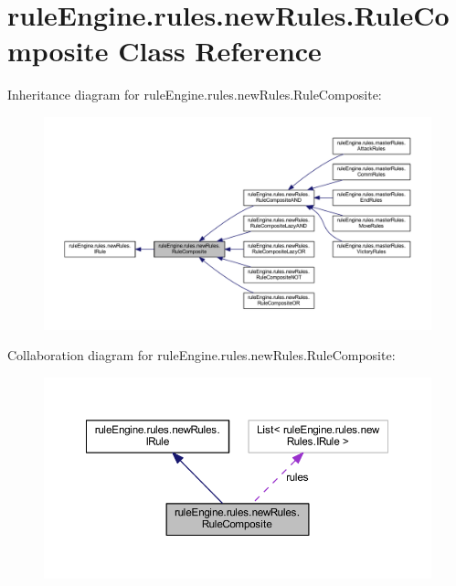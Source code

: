 \hypertarget{classrule_engine_1_1rules_1_1new_rules_1_1_rule_composite}{}\section{rule\+Engine.\+rules.\+new\+Rules.\+Rule\+Composite Class Reference}
\label{classrule_engine_1_1rules_1_1new_rules_1_1_rule_composite}


Inheritance diagram for rule\+Engine.\+rules.\+new\+Rules.\+Rule\+Composite\+:
\nopagebreak
\begin{figure}[H]
\begin{center}
\leavevmode
\includegraphics[width=350pt]{classrule_engine_1_1rules_1_1new_rules_1_1_rule_composite__inherit__graph}
\end{center}
\end{figure}


Collaboration diagram for rule\+Engine.\+rules.\+new\+Rules.\+Rule\+Composite\+:
\nopagebreak
\begin{figure}[H]
\begin{center}
\leavevmode
\includegraphics[width=350pt]{classrule_engine_1_1rules_1_1new_rules_1_1_rule_composite__coll__graph}
\end{center}
\end{figure}

